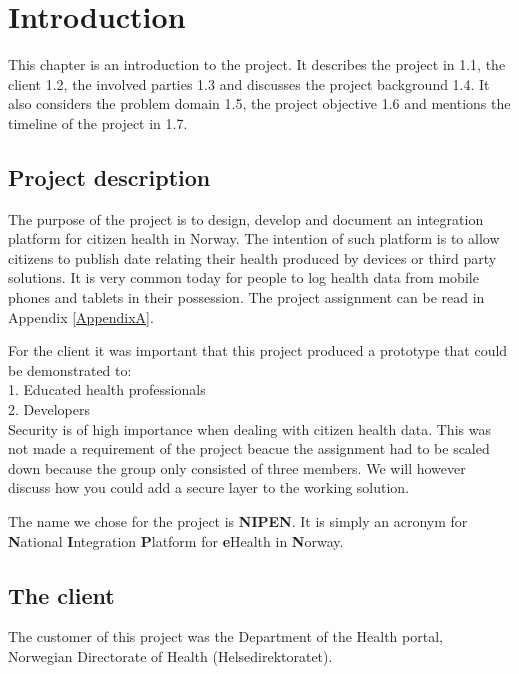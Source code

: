 \chapter{Introduction} 
\label{Introduction} 

This chapter is an introduction to the project. 
It describes the project in 1.1, the client 1.2, the involved parties 1.3 and discusses the project background 1.4. 
It also considers the problem domain 1.5, the project objective 1.6 and mentions the timeline of the project in 1.7.
\section{Project description}
\label{section:description}

The purpose of the project is to design, develop and document an integration platform for citizen health in Norway. 
The intention of such platform is to allow citizens to publish date relating their health produced by devices or third party solutions. 
It is very common today for people to log health data from mobile phones and tablets in their possession. The project assignment can be read in Appendix \ref{AppendixA}. 

For the client it was important that this project produced a prototype that could be demonstrated to: \\
1. Educated health professionals\\
2. Developers\\

Security is of high importance when dealing with citizen health data. This was not made a requirement of the project beacue the assignment had to be scaled down because the group only consisted of three members. 
We will however discuss how you could add a secure layer to the working solution. 

The name we chose for the project is \textbf{NIPEN}. It is simply an acronym for \textbf{N}ational \textbf{I}ntegration \textbf{P}latform for \textbf{e}Health in \textbf{N}orway.

\section{The client}
\label{section:client}

The customer of this project was the Department of the Health portal, Norwegian Directorate of Health (Helsedirektoratet).

